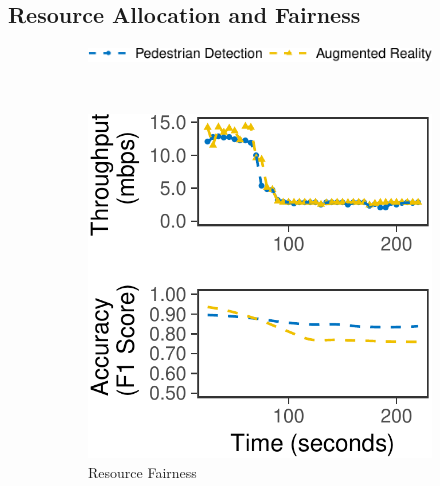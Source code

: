 \subsection{Resource Allocation and Fairness}
\label{sec:multi-task-alloc}
\begin{figure}
  \centering
  \begin{subfigure}[t]{0.8\columnwidth}
    \centering
    \includegraphics[width=\textwidth]{figures/multitask-legend.pdf}
  \end{subfigure}
  \\
  \vspace{1em}
  \begin{subfigure}[t]{0.45\columnwidth}
    \centering
    \includegraphics[width=\textwidth]{figures/multitask-left.pdf}
    \caption{Resource Fairness}
    \label{fig:eq-bw}
  \end{subfigure}
  \hfill
  \begin{subfigure}[t]{0.45\columnwidth}
    \centering

\end{subfigure}
\end{figure}
